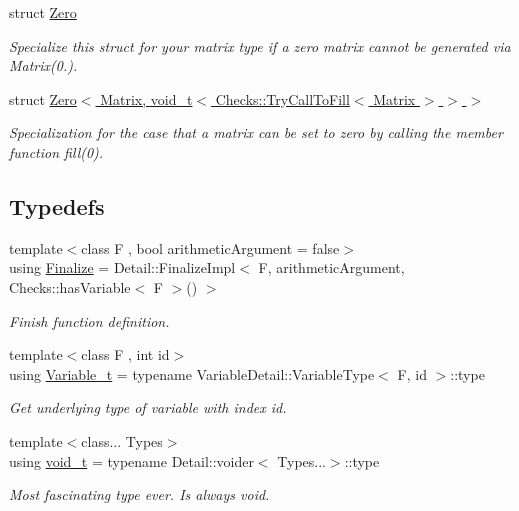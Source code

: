 \begin{DoxyCompactItemize}
struct \hyperlink{structRFFGen_1_1Zero}{Zero}
\begin{DoxyCompactList}\small\item\em Specialize this struct for your matrix type if a zero matrix cannot be generated via Matrix(0.). \end{DoxyCompactList}\item 
struct \hyperlink{structRFFGen_1_1Zero_3_01Matrix_00_01void__t_3_01Checks_1_1TryCallToFill_3_01Matrix_01_4_01_4_01_4}{Zero$<$ Matrix, void\-\_\-t$<$ Checks\-::\-Try\-Call\-To\-Fill$<$ Matrix $>$ $>$ $>$}
\begin{DoxyCompactList}\small\item\em Specialization for the case that a matrix can be set to zero by calling the member function fill(0). \end{DoxyCompactList}\end{DoxyCompactItemize}
\subsection*{Typedefs}
\begin{DoxyCompactItemize}
\item 
{\footnotesize template$<$class F , bool arithmetic\-Argument = false$>$ }\\using \hyperlink{namespaceRFFGen_a394df0f2ab428f4a972b4d93900a5e04}{Finalize} = Detail\-::\-Finalize\-Impl$<$ F, arithmetic\-Argument, Checks\-::has\-Variable$<$ F $>$() $>$
\begin{DoxyCompactList}\small\item\em Finish function definition. \end{DoxyCompactList}\item 
\hypertarget{namespaceRFFGen_acc6abb2e40c9688574411fd42898fab4}{{\footnotesize template$<$class F , int id$>$ }\\using \hyperlink{namespaceRFFGen_acc6abb2e40c9688574411fd42898fab4}{Variable\-\_\-t} = typename Variable\-Detail\-::\-Variable\-Type$<$ F, id $>$\-::type}\label{namespaceRFFGen_acc6abb2e40c9688574411fd42898fab4}

\begin{DoxyCompactList}\small\item\em Get underlying type of variable with index id. \end{DoxyCompactList}\item 
\hypertarget{namespaceRFFGen_a20e18569d04cc91cf19632c12cd4a0d8}{{\footnotesize template$<$class... Types$>$ }\\using \hyperlink{namespaceRFFGen_a20e18569d04cc91cf19632c12cd4a0d8}{void\-\_\-t} = typename Detail\-::voider$<$ Types...$>$\-::type}\label{namespaceRFFGen_a20e18569d04cc91cf19632c12cd4a0d8}

\begin{DoxyCompactList}\small\item\em Most fascinating type ever. Is always void. \end{DoxyCompactList}\end{DoxyCompactItemize}
